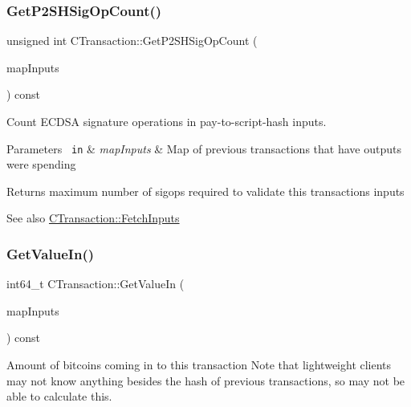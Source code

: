 \subsubsection{\texorpdfstring{GetP2SHSigOpCount()}{GetP2SHSigOpCount()}}
{\footnotesize\ttfamily unsigned int C\+Transaction\+::\+Get\+P2\+S\+H\+Sig\+Op\+Count (\begin{DoxyParamCaption}\item[{const Map\+Prev\+Tx \&}]{map\+Inputs }\end{DoxyParamCaption}) const}

Count E\+C\+D\+SA signature operations in pay-\/to-\/script-\/hash inputs.


\begin{DoxyParams}[1]{Parameters}
\mbox{\texttt{ in}}  & {\em map\+Inputs} & Map of previous transactions that have outputs we\textquotesingle{}re spending \\
\hline
\end{DoxyParams}
\begin{DoxyReturn}{Returns}
maximum number of sigops required to validate this transaction\textquotesingle{}s inputs 
\end{DoxyReturn}
\begin{DoxySeeAlso}{See also}
\mbox{\hyperlink{class_c_transaction_a5a4967303d3b588a120687f3ed1f4b0a}{C\+Transaction\+::\+Fetch\+Inputs}} 
\end{DoxySeeAlso}
\mbox{\label{class_c_transaction_a50051cce0d44bc4ea2018625101dc1b6}} 
\subsubsection{\texorpdfstring{GetValueIn()}{GetValueIn()}}
{\footnotesize\ttfamily int64\+\_\+t C\+Transaction\+::\+Get\+Value\+In (\begin{DoxyParamCaption}\item[{const Map\+Prev\+Tx \&}]{map\+Inputs }\end{DoxyParamCaption}) const}

Amount of bitcoins coming in to this transaction Note that lightweight clients may not know anything besides the hash of previous transactions, so may not be able to calculate this.


